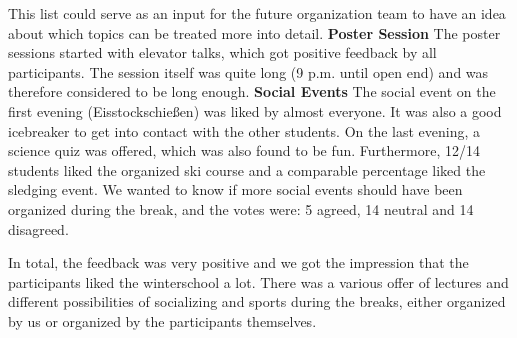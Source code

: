 This list could serve as an input for the future organization team to have an idea about which topics can be treated more into detail. 
\textbf{Poster Session}
The poster sessions started with elevator talks, which got positive feedback by all participants. The session itself was quite long (9 p.m. until open end) and was therefore considered to be long enough.
\textbf{Social Events}
The social event on the first evening (Eisstockschießen) was liked by almost everyone. It was also a good icebreaker to get into contact with the other students. On the last evening, a science quiz was offered, which was also found to be fun. Furthermore, 12/14 students liked the organized ski course and a comparable percentage liked the sledging event. We wanted to know if more social events should have been organized during the break, and the votes were: 5 agreed, 14 neutral and 14 disagreed.

In total, the feedback was very positive and we got the impression that the participants liked the winterschool a lot. There was a various offer of lectures and different possibilities of socializing and sports during the breaks, either organized by us or organized by the participants themselves. 


